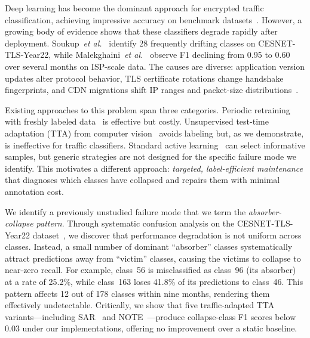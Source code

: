 \documentclass[journal]{IEEEtran}
\makeatletter
\newcommand{\etal}{\textit{et al.}\@}
\makeatother
\begin{document}
Deep learning has become the dominant approach for encrypted traffic classification, achieving impressive accuracy on benchmark datasets~\cite{lin2022etbert, zhao2023yatc, pacheco2019towards, wang2019survey}.
However, a growing body of evidence shows that these classifiers degrade rapidly after deployment.
Soukup~\etal{}~\cite{soukup2025drift} identify 28 frequently drifting classes on CESNET-TLS-Year22, while Malekghaini~\etal{}~\cite{malekghaini2023drift} observe F1 declining from 0.95 to 0.60 over several months on ISP-scale data.
The causes are diverse: application version updates alter protocol behavior, TLS certificate rotations change handshake fingerprints, and CDN migrations shift IP ranges and packet-size distributions~\cite{soukup2025drift, lu2019learning, gama2014survey}.

Existing approaches to this problem span three categories.
Periodic retraining with freshly labeled data~\cite{chen2025selfevolving} is effective but costly.
Unsupervised test-time adaptation (TTA) from computer vision~\cite{wang2021tent, niu2022eata, niu2023sar} avoids labeling but, as we demonstrate, is ineffective for traffic classifiers.
Standard active learning~\cite{settles2009active, sener2018coreset, ash2020badge} can select informative samples, but generic strategies are not designed for the specific failure mode we identify.
This motivates a different approach: \textit{targeted, label-efficient maintenance} that diagnoses which classes have collapsed and repairs them with minimal annotation cost.

We identify a previously unstudied failure mode that we term the \textit{absorber-collapse pattern}.
Through systematic confusion analysis on the CESNET-TLS-Year22 dataset~\cite{hynek2024cesnet}, we discover that performance degradation is not uniform across classes.
Instead, a small number of dominant ``absorber'' classes systematically attract predictions away from ``victim'' classes, causing the victims to collapse to near-zero recall.
For example, class~56 is misclassified as class~96 (its absorber) at a rate of 25.2\%, while class~163 loses 41.8\% of its predictions to class~46.
This pattern affects 12 out of 178 classes within nine months, rendering them effectively undetectable.
Critically, we show that five traffic-adapted TTA variants---including SAR~\cite{niu2023sar} and NOTE~\cite{gong2022note}---produce collapse-class F1 scores below 0.03 under our implementations, offering no improvement over a static baseline.
\end{document}
